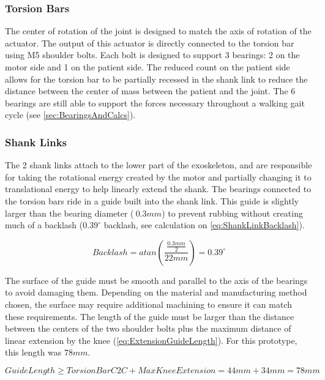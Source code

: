 \subsubsection{Torsion Bars}
The center of rotation of the joint is designed to match the axis of rotation of the actuator. The output of this actuator is directly connected to the torsion bar using M5 shoulder bolts. Each bolt is designed to support 3 bearings: 2 on the motor side and 1 on the patient side. The reduced count on the patient side allows for the torsion bar to be partially recessed in the shank link to reduce the distance between the center of mass between the patient and the joint. The 6 bearings are still able to support the forces necessary throughout a walking gait cycle (see \autoref{sec:BearingsAndCalcs}). 

\subsubsection{Shank Links}
The 2 shank links attach to the lower part of the exoskeleton, and are responsible for taking the rotational energy created by the motor and partially changing it to translational energy to help linearly extend the shank. The bearings connected to the torsion bars ride in a guide built into the shank link. This guide is slightly larger than the bearing diameter (\(~0.3mm\)) to prevent rubbing without creating much of a backlash (\(0.39^\circ\) backlash, see calculation on \autoref{eq:ShankLinkBacklash}).

\begin{equation}
    Backlash = atan(\frac{\frac{0.3mm}{2}}{22mm}) = 0.39^\circ
    \label{eq:ShankLinkBacklash}
\end{equation}

The surface of the guide must be smooth and parallel to the axis of the bearings to avoid damaging them. Depending on the material and manufacturing method chosen, the surface may require additional machining to ensure it can match these requirements. The length of the guide must be larger than the distance between the centers of the two shoulder bolts plus the maximum distance of linear extension by the knee (\autoref{eq:ExtensionGuideLength}). For this prototype, this length was \(78mm\).

\begin{equation}
    GuideLength \geq TorsionBarC2C + MaxKneeExtension = 44mm + 34mm = 78mm
    \label{eq:ExtensionGuideLength}
\end{equation}

